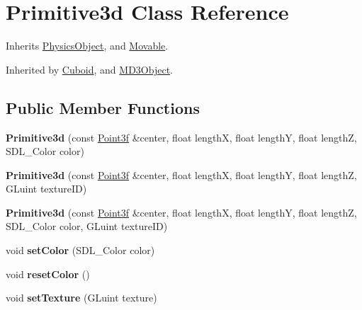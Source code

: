 \hypertarget{class_primitive3d}{\section{Primitive3d Class Reference}
\label{class_primitive3d}
}


Inherits \hyperlink{class_physics_object}{Physics\-Object}, and \hyperlink{class_movable}{Movable}.



Inherited by \hyperlink{class_cuboid}{Cuboid}, and \hyperlink{class_m_d3_object}{M\-D3\-Object}.

\subsection*{Public Member Functions}
\begin{DoxyCompactItemize}
\item 
\hypertarget{class_primitive3d_aa7f4f810090e38a446777621d1dd957d}{{\bfseries Primitive3d} (const \hyperlink{struct_point3f}{Point3f} \&center, float length\-X, float length\-Y, float length\-Z, S\-D\-L\-\_\-\-Color color)}\label{class_primitive3d_aa7f4f810090e38a446777621d1dd957d}

\item 
\hypertarget{class_primitive3d_af6c2aa4960338c608b25e41292ce6dd4}{{\bfseries Primitive3d} (const \hyperlink{struct_point3f}{Point3f} \&center, float length\-X, float length\-Y, float length\-Z, G\-Luint texture\-I\-D)}\label{class_primitive3d_af6c2aa4960338c608b25e41292ce6dd4}

\item 
\hypertarget{class_primitive3d_a0968e18617523fbb194de632c2fc8a3b}{{\bfseries Primitive3d} (const \hyperlink{struct_point3f}{Point3f} \&center, float length\-X, float length\-Y, float length\-Z, S\-D\-L\-\_\-\-Color color, G\-Luint texture\-I\-D)}\label{class_primitive3d_a0968e18617523fbb194de632c2fc8a3b}

\item 
\hypertarget{class_primitive3d_a4f1861797a6fb8dc7b3479bc7f7df80f}{void {\bfseries set\-Color} (S\-D\-L\-\_\-\-Color color)}\label{class_primitive3d_a4f1861797a6fb8dc7b3479bc7f7df80f}

\item 
\hypertarget{class_primitive3d_ad76294a2b5a5648135b62fe8ebb7d1b4}{void {\bfseries reset\-Color} ()}\label{class_primitive3d_ad76294a2b5a5648135b62fe8ebb7d1b4}

\item 
\hypertarget{class_primitive3d_a5872ebbfceded408cb77706fd5f9d565}{void {\bfseries set\-Texture} (G\-Luint texture)}\label{class_primitive3d_a5872ebbfceded408cb77706fd5f9d565}


\end{DoxyCompactItemize}
